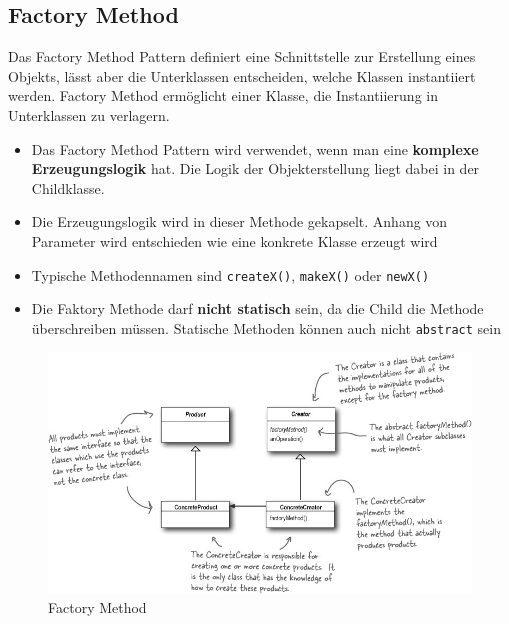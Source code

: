 \clearpage


\subsection{Factory Method}
\label{sec:factorymethod}
Das Factory Method Pattern definiert eine Schnittstelle zur Erstellung eines Objekts, lässt aber die Unterklassen entscheiden, welche Klassen instantiiert werden. Factory Method ermöglicht einer Klasse, die Instantiierung in Unterklassen zu verlagern.
\begin{itemize}
	\item Das Factory Method Pattern wird verwendet, wenn man eine \textbf{komplexe Erzeugungslogik} hat. Die Logik der Objekterstellung liegt dabei in der Childklasse.
	\item Die Erzeugungslogik wird in dieser Methode gekapselt. Anhang von Parameter wird entschieden wie eine konkrete Klasse erzeugt wird
	\item Typische Methodennamen sind \lstinline|createX()|, \lstinline|makeX()| oder \lstinline|newX()|
	\item Die Faktory Methode darf \textbf{nicht statisch} sein, da die Child die Methode überschreiben müssen. Statische Methoden können auch nicht \lstinline|abstract| sein
\end{itemize}

\begin{figure}[h]
	\centering
	\includegraphics[width=0.9\linewidth]{images/factory_method_pattern}
	\caption{Factory Method}
	\label{fig:factorymethodpattern}
\end{figure}

\clearpage

